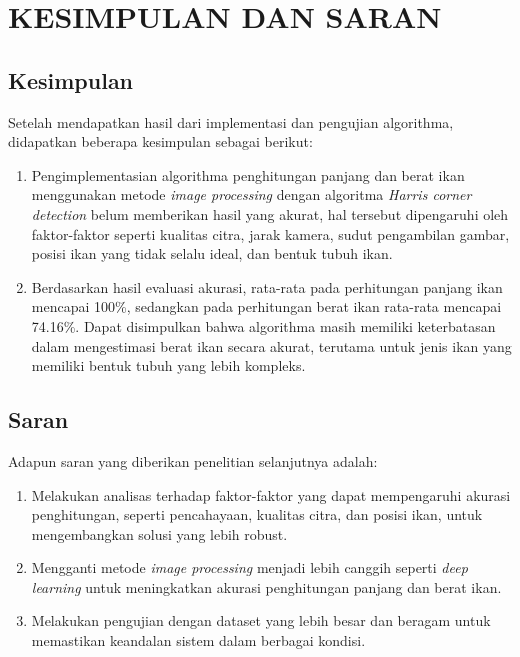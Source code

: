 
\chapter{KESIMPULAN DAN SARAN}

\section{Kesimpulan}
Setelah mendapatkan hasil dari implementasi dan pengujian algorithma, didapatkan beberapa kesimpulan sebagai berikut:

\begin{enumerate}
	\setlength{\parskip}{0pt}
	\item Pengimplementasian algorithma penghitungan panjang dan berat ikan menggunakan metode \textit{image processing} dengan algoritma \textit{Harris corner detection} belum memberikan hasil yang akurat, hal tersebut dipengaruhi oleh faktor-faktor seperti kualitas citra, jarak kamera, sudut pengambilan gambar, posisi ikan yang tidak selalu ideal, dan bentuk tubuh ikan.
	\item Berdasarkan hasil evaluasi akurasi, rata-rata pada perhitungan panjang ikan mencapai 100\%, sedangkan pada perhitungan berat ikan rata-rata mencapai 74.16\%. Dapat disimpulkan bahwa algorithma masih memiliki keterbatasan dalam mengestimasi berat ikan secara akurat, terutama untuk jenis ikan yang memiliki bentuk tubuh yang lebih kompleks.
\end{enumerate}

\section{Saran}
Adapun saran yang diberikan penelitian selanjutnya adalah:
\begin{enumerate}
	\setlength{\parskip}{0pt} 
	\item Melakukan analisas terhadap faktor-faktor yang dapat mempengaruhi akurasi penghitungan, seperti pencahayaan, kualitas citra, dan posisi ikan, untuk mengembangkan solusi yang lebih robust.
	\item Mengganti metode \textit{image processing} menjadi lebih canggih seperti \textit{deep learning} untuk meningkatkan akurasi penghitungan panjang dan berat ikan.
	\item Melakukan pengujian dengan dataset yang lebih besar dan beragam untuk memastikan keandalan sistem dalam berbagai kondisi.
\end{enumerate}

